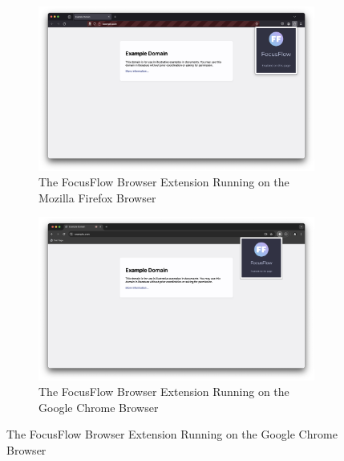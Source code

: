 \documentclass{report}
\begin{document}
\begin{figure}
    \centering
    \begin{subfigure}[b]{0.45\textwidth}
        \centering
        \includegraphics[width=\textwidth]{../assets/FocusFlow-firefox.png}
        \caption{The FocusFlow Browser Extension Running on the Mozilla Firefox Browser}
    \end{subfigure}
    \hfill
    \begin{subfigure}[b]{0.45\textwidth}
        \centering
        \includegraphics[width=\textwidth]{../assets/FocusFlow-chrome.png}
        \caption{The FocusFlow Browser Extension Running on the Google Chrome Browser}
    \end{subfigure}


\end{figure}
\end{document}
